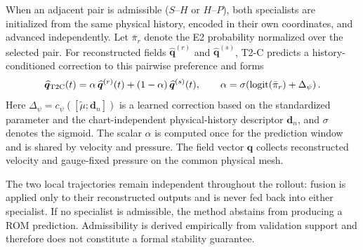 When an adjacent pair is admissible ($S$--$H$ or $H$--$P$), both specialists are initialized from the same physical history, encoded in
their own coordinates, and advanced independently. Let $\bar\pi_r$ denote the E2 probability normalized over the selected pair. For reconstructed fields $\widehat{\bm q}^{(r)}$ and $\widehat{\bm q}^{(s)}$, T2-C predicts a history-conditioned correction to this pairwise preference and forms
\begin{equation}
  \widehat{\bm q}_{\rm T2C}(t)
  =\alpha\,\widehat{\bm q}^{(r)}(t)
  +(1-\alpha)\,\widehat{\bm q}^{(s)}(t),
  \qquad
  \alpha=
  \sigma\!\left(
  \operatorname{logit}(\bar\pi_r)+\Delta_\psi
  \right).
  \label{eq:main_t2c}
\end{equation}
Here $\Delta_\psi=c_\psi([\widetilde\mu;\bm d_n])$ is a learned correction based on the standardized parameter and the chart-independent physical-history descriptor $\bm d_n$, and $\sigma$ denotes the sigmoid. The scalar $\alpha$ is computed once for the prediction window and is shared by velocity and pressure. The field vector $\bm q$ collects reconstructed velocity and gauge-fixed pressure on the common physical mesh.

The two local trajectories remain independent throughout the rollout: fusion is applied only to their reconstructed outputs and is never fed back into either specialist. If no specialist is admissible, the method abstains from producing a ROM prediction. Admissibility is derived empirically from validation support and therefore does not constitute a formal stability guarantee.

